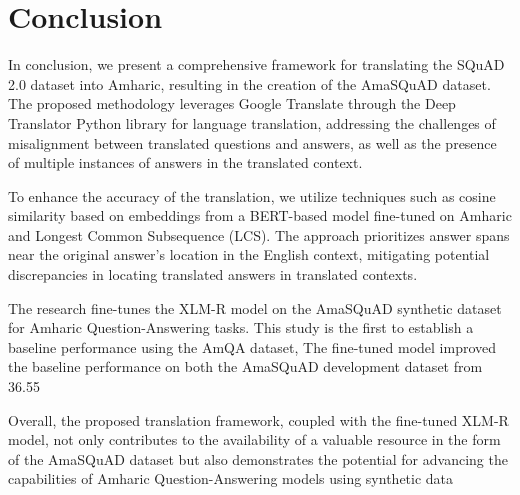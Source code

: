 \section{Conclusion}
In conclusion, we present a comprehensive framework for translating the SQuAD 2.0 dataset into Amharic, resulting in the creation of the AmaSQuAD dataset. The proposed methodology leverages Google Translate through the Deep Translator Python library for language translation, addressing the challenges of misalignment between translated questions and answers, as well as the presence of multiple instances of answers in the translated context.

To enhance the accuracy of the translation, we utilize techniques such as cosine similarity based on embeddings from a BERT-based model fine-tuned on Amharic and Longest Common Subsequence (LCS). The approach prioritizes answer spans near the original answer's location in the English context, mitigating potential discrepancies in locating translated answers in translated contexts.

The research fine-tunes the XLM-R model on the AmaSQuAD synthetic dataset for Amharic Question-Answering tasks. This study is the first to establish a baseline performance using the AmQA dataset, The fine-tuned model improved the baseline performance on both the AmaSQuAD development dataset from  36.55%

Overall, the proposed translation framework, coupled with the fine-tuned XLM-R model, not only contributes to the availability of a valuable resource in the form of the AmaSQuAD dataset but also demonstrates the potential for advancing the capabilities of Amharic Question-Answering models using synthetic data

